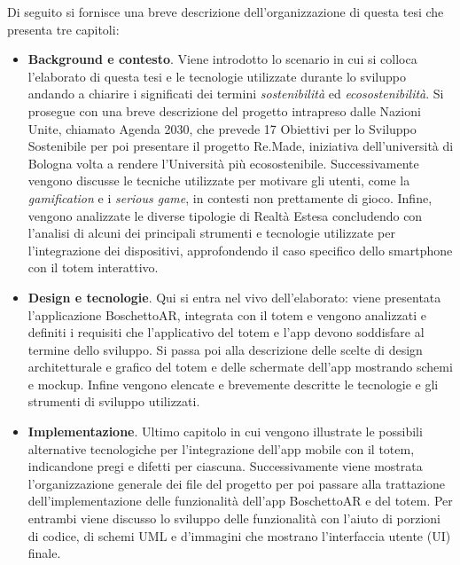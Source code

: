 Di seguito si fornisce una breve descrizione dell'organizzazione di questa tesi che presenta tre capitoli: 
\begin{itemize}
    \itemsep1em
    \item \textbf{Background e contesto}. Viene introdotto lo scenario in cui si colloca l'elaborato di questa tesi e le tecnologie utilizzate durante lo sviluppo andando a chiarire i significati dei termini \textit{sostenibilità} ed \textit{ecosostenibilità}. Si prosegue con una breve descrizione del progetto intrapreso dalle Nazioni Unite, chiamato Agenda 2030, che prevede 17 Obiettivi per lo Sviluppo Sostenibile per poi presentare il progetto Re.Made, iniziativa dell'università di Bologna volta a rendere l'Università più ecosostenibile.
    Successivamente vengono discusse le tecniche utilizzate per motivare gli utenti, come la \textit{gamification} e i \textit{serious game}, in contesti non prettamente di gioco. Infine, vengono analizzate le diverse tipologie di Realtà Estesa concludendo con l'analisi di alcuni dei principali strumenti e tecnologie utilizzate per l'integrazione dei dispositivi, approfondendo il caso specifico dello smartphone con il totem interattivo.
    \item \textbf{Design e tecnologie}. Qui si entra nel vivo dell'elaborato: viene presentata l'applicazione BoschettoAR, integrata con il totem e vengono analizzati e definiti i requisiti che l'applicativo del totem e l'app devono soddisfare al termine dello sviluppo. Si passa poi alla descrizione delle scelte di design architetturale e grafico del totem e delle schermate dell'app mostrando schemi e mockup. Infine vengono elencate e brevemente descritte le tecnologie e gli strumenti di sviluppo utilizzati.
    \item \textbf{Implementazione}. Ultimo capitolo in cui vengono illustrate le possibili alternative tecnologiche per l'integrazione dell'app mobile con il totem, indicandone pregi e difetti per ciascuna. Successivamente viene mostrata l'organizzazione generale dei file del progetto per poi passare alla trattazione dell'implementazione delle funzionalità dell'app BoschettoAR e del totem.
    Per entrambi viene discusso lo sviluppo delle funzionalità con l'aiuto di porzioni di codice, di schemi UML e d'immagini che mostrano l'interfaccia utente (UI) finale.
\end{itemize}